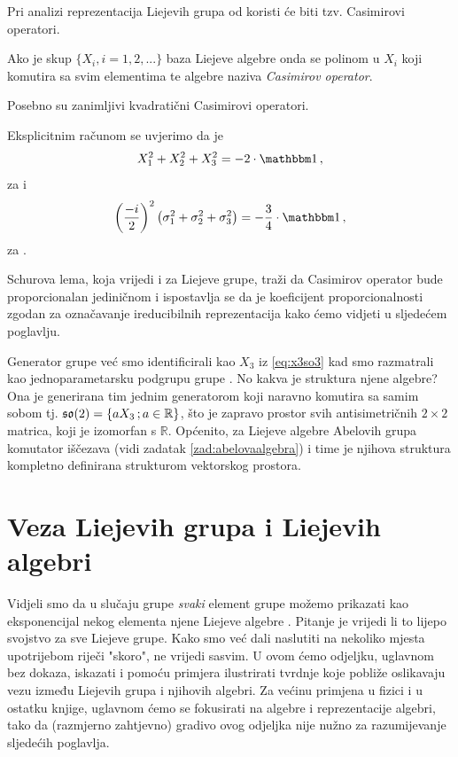 Pri analizi reprezentacija Liejevih grupa od koristi će biti
tzv. Casimirovi operatori.
\begin{definicija}
Ako je skup $\{X_i, i=1,2, ... \}$ baza Liejeve algebre onda se polinom
u $X_i$ koji komutira sa svim elementima te algebre naziva 
\emph{Casimirov operator}.
\end{definicija}
Posebno su zanimljivi kvadratični Casimirovi operatori.
\begin{primjer}
 Eksplicitnim računom se uvjerimo da je 
\begin{equation}
X_{1}^2 + X_{2}^2 + X_{3}^2 = -2\cdot \Eins \,,
\end{equation}
    za  i
\begin{equation}
    \left(\frac{-i}{2}\right)^2
    \big(\sigma_{1}^2 + \sigma_{2}^2 + \sigma_{3}^2\big) = -\frac{3}{4} \cdot \Eins \,,
\end{equation}
    za .
\end{primjer}
Schurova lema, koja vrijedi i za Liejeve grupe, traži da Casimirov operator 
bude proporcionalan jediničnom i ispostavlja se da je koeficijent proporcionalnosti
zgodan za označavanje ireducibilnih reprezentacija kako ćemo vidjeti u sljedećem poglavlju.


\begin{primjer}
    Generator grupe  već smo identificirali kao $X_3$ iz
    \ref{eq:x3so3} kad smo 
    razmatrali kao jednoparametarsku podgrupu grupe .
    No kakva je struktura njene algebre? Ona je generirana tim
    jednim generatorom koji naravno komutira sa samim sobom
    tj. $\mathfrak{so}(2) = \{ aX_{3}\,; a \in \mathbb{R} \}$, što je
    zapravo prostor svih antisimetričnih $2\times 2$ matrica,
    koji je izomorfan s $\mathbb{R}$.
    Općenito, za Liejeve algebre Abelovih grupa komutator iščezava 
    (vidi zadatak \ref{zad:abelovaalgebra}) i time
    je njihova struktura kompletno definirana strukturom vektorskog
    prostora. \label{pr:so2Alg}
\end{primjer}


\section{Veza Liejevih grupa i Liejevih algebri}

Vidjeli smo da u slučaju grupe  
\emph{svaki} element grupe možemo prikazati kao eksponencijal nekog
elementa njene Liejeve algebre .
Pitanje je vrijedi li to lijepo svojstvo za sve Liejeve grupe.
Kako smo već dali naslutiti na nekoliko mjesta upotrijebom riječi "skoro",
ne vrijedi sasvim. U ovom ćemo odjeljku, uglavnom
bez dokaza, iskazati i pomoću primjera ilustrirati tvrdnje koje 
pobliže oslikavaju vezu između Liejevih grupa i njihovih algebri.
Za većinu primjena u fizici i u ostatku knjige, uglavnom ćemo
se fokusirati na algebre i reprezentacije algebri, tako da (razmjerno
zahtjevno) gradivo ovog odjeljka nije nužno za razumijevanje sljedećih
poglavlja.

